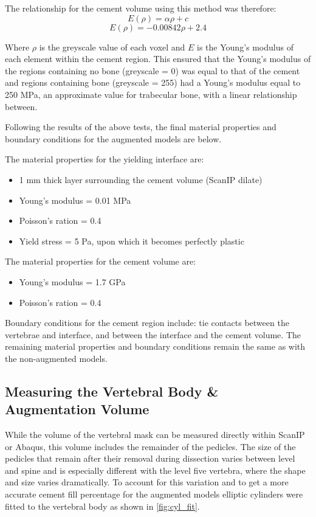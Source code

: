 The relationship for the cement volume using this method was therefore:
\begin{equation}
	E(\rho) = \alpha \rho + c
\end{equation}
\begin{equation}
	E(\rho) = -0.00842 \rho + 2.4
\end{equation}

Where $\rho$ is the greyscale value of each voxel and $E$ is the Young's modulus of each element within the cement region.
This ensured that the Young's modulus of the regions containing no bone (greyscale = 0)  was equal to that of the cement and regions containing bone (greyscale = 255) had a Young's modulus equal to 250 MPa, an approximate value for trabecular bone, with a linear relationship between.

Following the results of the above tests, the final material properties and boundary conditions for the augmented models are below.

The material properties for the yielding interface are:
\begin{itemize}
	\item 1 mm thick layer surrounding the cement volume (ScanIP dilate)
	\item Young's modulus =  0.01 MPa
	\item Poisson's ration = 0.4
	\item Yield stress = 5 Pa, upon which it becomes perfectly plastic
\end{itemize}

The material properties for the cement volume are:
\begin{itemize}
	\item Young's modulus =  1.7 GPa
	\item Poisson's ration = 0.4
\end{itemize}

Boundary conditions for the cement region include: tie contacts between the vertebrae and interface, and between the interface and the cement volume.
The remaining material properties and boundary conditions remain the same as with the non-augmented models.

\subsection{Measuring the Vertebral Body \& Augmentation Volume}

While the volume of the vertebral mask can be measured directly within ScanIP or Abaqus, this volume includes the remainder of the pedicles.
The size of the pedicles that remain after their removal during dissection varies between level and spine and is especially different with the level five vertebra, where the shape and size varies dramatically.
To account for this variation and to get a more accurate cement fill percentage for the augmented models elliptic cylinders were fitted to the vertebral body as shown in \cref{fig:cyl_fit}.



